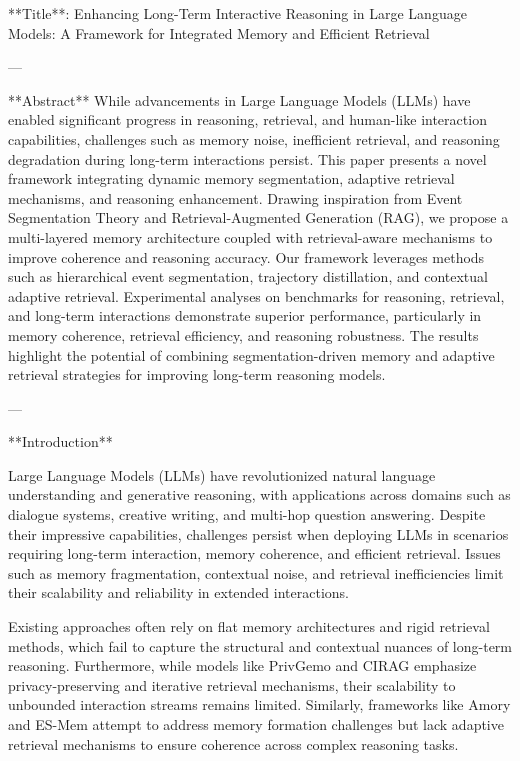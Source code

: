 **Title**: Enhancing Long-Term Interactive Reasoning in Large Language Models: A Framework for Integrated Memory and Efficient Retrieval  

---

**Abstract**  
While advancements in Large Language Models (LLMs) have enabled significant progress in reasoning, retrieval, and human-like interaction capabilities, challenges such as memory noise, inefficient retrieval, and reasoning degradation during long-term interactions persist. This paper presents a novel framework integrating dynamic memory segmentation, adaptive retrieval mechanisms, and reasoning enhancement. Drawing inspiration from Event Segmentation Theory and Retrieval-Augmented Generation (RAG), we propose a multi-layered memory architecture coupled with retrieval-aware mechanisms to improve coherence and reasoning accuracy. Our framework leverages methods such as hierarchical event segmentation, trajectory distillation, and contextual adaptive retrieval. Experimental analyses on benchmarks for reasoning, retrieval, and long-term interactions demonstrate superior performance, particularly in memory coherence, retrieval efficiency, and reasoning robustness. The results highlight the potential of combining segmentation-driven memory and adaptive retrieval strategies for improving long-term reasoning models.

---

**Introduction**  

Large Language Models (LLMs) have revolutionized natural language understanding and generative reasoning, with applications across domains such as dialogue systems, creative writing, and multi-hop question answering. Despite their impressive capabilities, challenges persist when deploying LLMs in scenarios requiring long-term interaction, memory coherence, and efficient retrieval. Issues such as memory fragmentation, contextual noise, and retrieval inefficiencies limit their scalability and reliability in extended interactions.  

Existing approaches often rely on flat memory architectures and rigid retrieval methods, which fail to capture the structural and contextual nuances of long-term reasoning. Furthermore, while models like PrivGemo and CIRAG emphasize privacy-preserving and iterative retrieval mechanisms, their scalability to unbounded interaction streams remains limited. Similarly, frameworks like Amory and ES-Mem attempt to address memory formation challenges but lack adaptive retrieval mechanisms to ensure coherence across complex reasoning tasks.  

